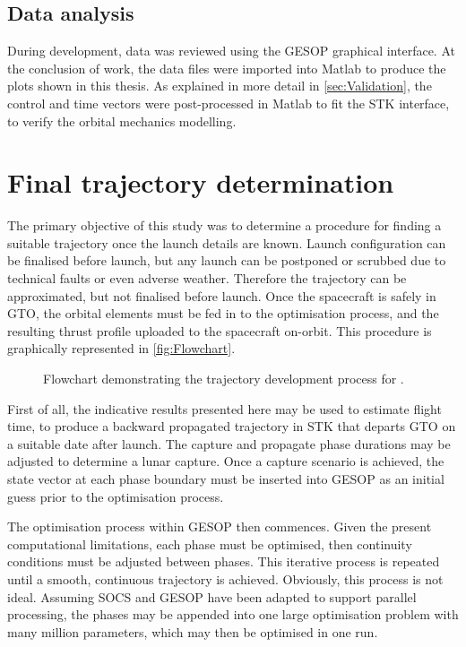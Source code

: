 \subsection{Data analysis} \label{sub:Data-analysis}

During development, data was reviewed using the GESOP graphical interface. At the conclusion of work, the data files were imported into Matlab to produce the plots shown in this thesis. As explained in more detail in \autoref{sec:Validation}, the control and time vectors were post-processed in Matlab to fit the STK interface, to verify the orbital mechanics modelling.



\section{Final trajectory determination} \label{sec:Method-application}

The primary objective of this study was to determine a procedure for finding a suitable trajectory once the launch details are known. Launch configuration can be finalised before launch, but any launch can be postponed or scrubbed due to technical faults or even adverse weather. Therefore the trajectory can be approximated, but not finalised before launch. Once the spacecraft is safely in GTO, the orbital elements must be fed in to the optimisation process, and the resulting thrust profile uploaded to the spacecraft on-orbit. This procedure is graphically represented in \autoref{fig:Flowchart}.

\begin{figure}
\centering
\def\svgwidth{0.6\textwidth}

\caption{Flowchart demonstrating the trajectory development process for \BW.} \label{fig:Flowchart}
\end{figure}

First of all, the indicative results presented here may be used to estimate flight time, to produce a backward propagated trajectory in STK that departs GTO on a suitable date after launch. The capture and propagate phase durations may be adjusted to determine a lunar capture. Once a capture scenario is achieved, the state vector at each phase boundary must be inserted into GESOP as an initial guess prior to the optimisation process. 

The optimisation process within GESOP then commences. Given the present computational limitations, each phase must be optimised, then continuity conditions must be adjusted between phases. This iterative process is repeated until a smooth, continuous trajectory is achieved. Obviously, this process is not ideal. Assuming SOCS and GESOP have been adapted to support parallel processing, the phases may be appended into one large optimisation problem with many million parameters, which may then be optimised in one run.

